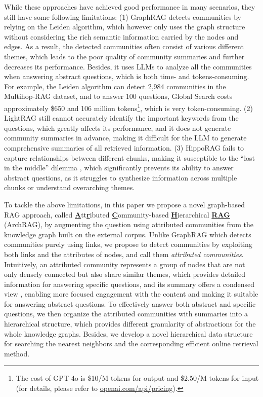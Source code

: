 While these approaches have achieved good performance in many scenarios, they still have some following limitations: 
% 
(1) GraphRAG detects communities by relying on the Leiden algorithm, which however only uses the graph structure without considering the rich semantic information carried by the nodes and edges. 
% 
As a result, the detected communities often consist of various different themes, which leads to the poor quality of community summaries and further decreases its performance.
% 
Besides, it uses LLMs to analyze all the communities when answering abstract questions, which is both time- and tokens-consuming.
% 
For example, the Leiden algorithm can detect 2,984 communities in the Multihop-RAG dataset, and to answer 100 questions, Global Search costs approximately \$650 and 106 million tokens\footnote{The cost of GPT-4o is \$10/M tokens for output and \$2.50/M tokens for input (for details, please refer to \href{https://openai.com/api/pricing/}{openai.com/api/pricing}).}, which is very token-consuming. 
% 
(2) LightRAG still cannot accurately identify the important keywords from the questions, which greatly affects its performance, and it does not generate community summaries in advance, making it difficult for the LLM to generate comprehensive summaries of all retrieved information.
% 
(3) HippoRAG fails to capture relationships between different chunks, making it susceptible to the ``lost in the middle'' dilemma \cite{liu2024lost}, which significantly prevents its ability to answer abstract questions, as it struggles to synthesize information across multiple chunks or understand overarching themes.

To tackle the above limitations, in this paper we propose a novel graph-based RAG approach, called \textbf{\underline{A}}tt\textbf{\underline{r}}ibuted \textbf{\underline{C}}ommunity-based \textbf{\underline{H}}ierarchical \textbf{\underline{RAG}} (ArchRAG), by augmenting the question using attributed communities from the knowledge graph built on the external corpus.
%
Unlike GraphRAG which detects communities purely using links, we propose to detect communities by exploiting both links and the attributes of nodes, and call them {\it attributed communities}.
%
Intuitively, an attributed community represents a group of nodes that are not only densely connected but also share similar themes, which provides detailed information for answering specific questions, and its summary offers a condensed view \cite{sarthi2024raptor,angelidis2018summarizing}, enabling more focused engagement with the content and making it suitable for answering abstract questions.
%
To effectively answer both abstract and specific questions, we then organize the attributed communities with summaries into a hierarchical structure, which provides different granularity of abstractions for the whole knowledge graphs.
% 
Besides, we develop a novel hierarchical data structure for searching the nearest neighbors and the corresponding efficient online retrieval method.

